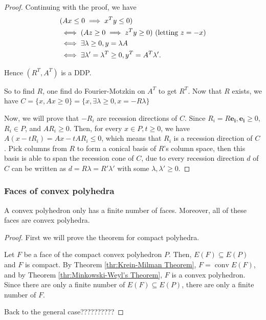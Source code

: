 \begin{proof}
Continuing with the proof, we have
\begin{align*}
  &(Ax \le 0 \implies x^{T}y \le 0)\\
  &\iff(Az \ge  0 \implies z^{T}y \ge  0) \text{ (letting \( z = -x \))}\\
  &\iff \exists \lambda \ge 0,  y = \lambda A\\
  &\iff \exists  \lambda' = \lambda^{T} \ge 0, y^{T} = A^{T}\lambda'
.\end{align*}

Hence \( (R^{T}, A^{T}) \) is a DDP.

So to find \( R \), one find do Fourier-Motzkin on \( A^{T} \) to get \( R^{T}
\). Now that \( R \) exists, we have \( C = \{x, Ax \ge 0\} = \{x, \exists
\lambda \ge 0, x = -R\lambda\}  \)

Now, we will prove that \( -R_{i} \) are recession directions of \( C \).
Since \( R_{i} = R\mathbf{e_{i}}, \mathbf{e_{i}} \ge 0 \), \( R_{i} \in P \),
and \( AR_{i} \ge  0 \). Then, for every \( x \in P, t \ge 0 \), we have \( A(x
- tR_{i}) = Ax - tAR_{i} \le  0 \), which means that \( R_{i} \) is a recession
direction of \( C \). Pick columns from \( R \) to form a conical basis of \( R \)'s
column space, then this basis is able to span the recession cone of \( C \), due
to every recession direction \( d \) of \( C \) can be written as \( d =
R\lambda = R'\lambda' \) with some \( \lambda, \lambda' \ge  0 \).
\end{proof}

\subsubsection{Faces of convex polyhedra} %
\label{sec:Faces of convex polyhedra}

\begin{theorem}
\label{thr:Basic properties of faces}
  A convex polyhedron only has a finite number of faces. Moreover, all of these
  faces are convex polyhedra.
\end{theorem}

\begin{proof}
  First we will prove the theorem for compact polyhedra.

  Let \( F \) be a face of the compact convex polyhedron \( P \). Then, \( E(F)
  \subseteq E(P) \) and \( F \) is compact. By Theorem \ref{thr:Krein-Milman
  Theorem}, \( F = \operatorname{conv} E(F) \), and by Theorem
  \ref{thr:Minkowski-Weyl's Theorem}, \( F \) is a convex polyhedron. Since
  there are only a finite number of \( E(F) \subseteq E(P) \), there are only
  a finite number of \( F \).

  Back to the general case??????????
\end{proof}

